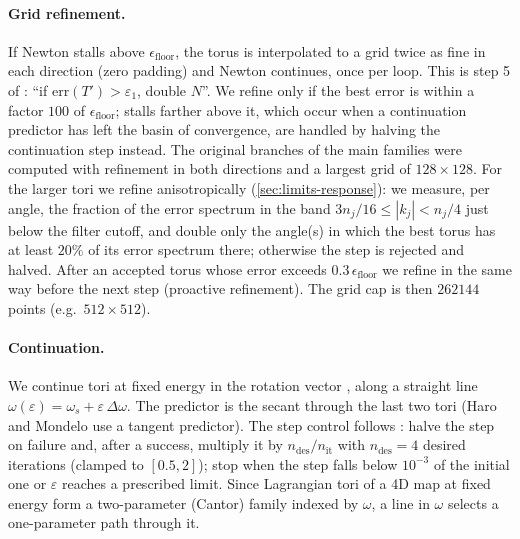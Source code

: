 \documentclass[11pt]{article}
\begin{document}
\paragraph{Grid refinement.} If Newton stalls above $\epsilon_{\mathrm{floor}}$, the torus is
interpolated to a grid twice as fine in each direction (zero padding) and Newton continues, once
per loop. This is step 5 of \cite[Alg.~3.6.1, p.~30]{haromondelo2021flow}: ``if
$\mathrm{err}(T')>\varepsilon_1$, double $N$''. We refine only if the best error is within a
factor $100$ of $\epsilon_{\mathrm{floor}}$; stalls farther above it, which occur when a
continuation predictor has left the basin of convergence, are handled by halving the
continuation step instead. The original branches of the main families were computed with refinement in both directions and
a largest grid of $128\times128$. For the larger tori we refine anisotropically
(\cref{sec:limits-response}): we measure, per angle, the fraction of the error spectrum in the band
$3n_j/16\le|k_j|<n_j/4$ just below the filter cutoff, and double only the angle(s) in which the best
torus has at least $20\%$ of its error spectrum there; otherwise the step is rejected and halved.
After an accepted torus whose error exceeds $0.3\,\epsilon_{\mathrm{floor}}$ we refine in the same
way before the next step (proactive refinement). The grid cap is then $262144$ points (e.g.\
$512\times512$).

\paragraph{Continuation.} We continue tori at fixed energy in the rotation vector
\cite[Sec.~3.5, Alg.~3.5.4]{haromondelo2021flow}, along a straight line
$\omega(\varepsilon) = \omega_s + \varepsilon\,\Delta\omega$. The predictor is the secant through
the last two tori (Haro and Mondelo use a tangent predictor). The step control follows
\cite[Alg.~3.6.1, pp.~29--30]{haromondelo2021flow}: halve the step on failure and, after a success,
multiply it by $n_{\mathrm{des}}/n_{\mathrm{it}}$ with $n_{\mathrm{des}}=4$ desired iterations
(clamped to $[0.5,2]$); stop when the step falls below $10^{-3}$ of the initial one or $\varepsilon$
reaches a prescribed limit. Since Lagrangian tori of a 4D map at fixed energy form a two-parameter
(Cantor) family indexed by $\omega$, a line in $\omega$ selects a one-parameter path through it.
\end{document}
